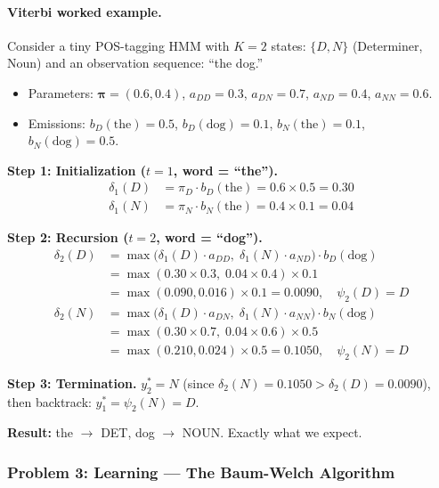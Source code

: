 \paragraph{Viterbi worked example.}
Consider a tiny POS-tagging HMM with $K = 2$ states: $\{D, N\}$
(Determiner, Noun) and an observation sequence: ``the dog.''

\begin{itemize}
    \item Parameters: $\bm{\pi} = (0.6, 0.4)$, \;
          $a_{DD} = 0.3$, $a_{DN} = 0.7$, $a_{ND} = 0.4$, $a_{NN} = 0.6$.
    \item Emissions: $b_D(\text{the}) = 0.5$, $b_D(\text{dog}) = 0.1$,
          $b_N(\text{the}) = 0.1$, $b_N(\text{dog}) = 0.5$.
\end{itemize}

\textbf{Step 1: Initialization ($t=1$, word = ``the'').}
\begin{align*}
\delta_1(D) &= \pi_D \cdot b_D(\text{the}) = 0.6 \times 0.5 = 0.30 \\
\delta_1(N) &= \pi_N \cdot b_N(\text{the}) = 0.4 \times 0.1 = 0.04
\end{align*}

\textbf{Step 2: Recursion ($t=2$, word = ``dog'').}
\begin{align*}
\delta_2(D) &= \max\bigl(\delta_1(D) \cdot a_{DD},\; \delta_1(N) \cdot a_{ND}\bigr) \cdot b_D(\text{dog}) \\
            &= \max(0.30 \times 0.3,\; 0.04 \times 0.4) \times 0.1 \\
            &= \max(0.090, 0.016) \times 0.1 = 0.0090, \quad \psi_2(D) = D \\[4pt]
\delta_2(N) &= \max\bigl(\delta_1(D) \cdot a_{DN},\; \delta_1(N) \cdot a_{NN}\bigr) \cdot b_N(\text{dog}) \\
            &= \max(0.30 \times 0.7,\; 0.04 \times 0.6) \times 0.5 \\
            &= \max(0.210, 0.024) \times 0.5 = 0.1050, \quad \psi_2(N) = D
\end{align*}

\textbf{Step 3: Termination.}
$y_2^* = N$ (since $\delta_2(N) = 0.1050 > \delta_2(D) = 0.0090$),
then backtrack: $y_1^* = \psi_2(N) = D$.

\textbf{Result:} the $\to$ DET, dog $\to$ NOUN.  Exactly what we expect.

\subsubsection{Problem 3: Learning --- The Baum-Welch Algorithm}

